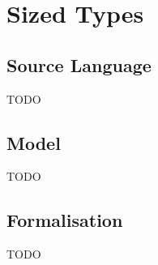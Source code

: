 \chapter{Sized Types}

\section{Source Language}
TODO


\section{Model}
TODO


\section{Formalisation}
TODO